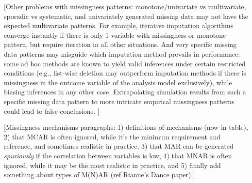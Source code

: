 \documentclass[bimj,fleqn]{w-art}
\begin{document}

[Other problems with missingness patterns: monotone/univariate vs multivariate, sporadic vs systematic, and univariately generated missing data may not have the expected multivariate patterns. For example, iterative imputation algorithms converge instantly if there is only 1 variable with missingness or monotone pattern, but require iteration in all other situations. And very specific missing data patterns may misguide which imputation method prevails in performance: some ad hoc methods are known to yield valid inferences under certain restricted conditions (e.g., list-wise deletion may outperform imputation methods if there is missingness in the outcome variable of the analysis model exclusively), while biasing inferences in any other case. Extrapolating simulation results from such a specific missing data pattern to more intricate empirical missingness patterns could lead to false conclusions. ]

[Missingness mechanisms paragraphs: 1) definitions of mechanisms (now in table), 2) that MCAR is often ignored, while it's the minimum requirement and reference, and sometimes realistic in practice, 3) that MAR can be generated \textit{spuriously} if the correlation between variables is low,  4) that MNAR is often ignored, while it may be the most realistic in practice, and 5) finally add something about types of M(N)AR (ref Rianne's Dance paper).]

\end{document}
